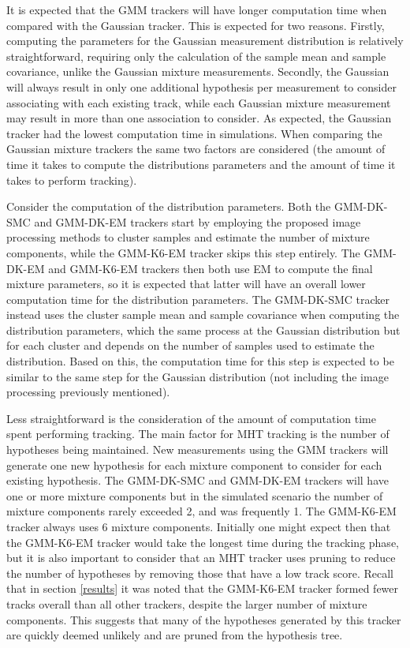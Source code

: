 \documentclass[journal]{IEEEtran}
\begin{document}
It is expected that the GMM trackers will have longer computation time when compared with the Gaussian tracker. This is expected for two reasons. Firstly, computing the parameters for the Gaussian measurement distribution is relatively straightforward, requiring only the calculation of the sample mean and sample covariance, unlike the Gaussian mixture measurements. Secondly, the Gaussian will always result in only one additional hypothesis per measurement to consider associating with each existing track, while each Gaussian mixture measurement may result in more than one association to consider. As expected, the Gaussian tracker had the lowest computation time in simulations. When comparing the Gaussian mixture trackers the same two factors are considered (the amount of time it takes to compute the distributions parameters and the amount of time it takes to perform tracking).

Consider the computation of the distribution parameters. Both the GMM-DK-SMC and GMM-DK-EM trackers start by employing the proposed image processing methods to cluster samples and estimate the number of mixture components, while the GMM-K6-EM tracker skips this step entirely. The GMM-DK-EM and GMM-K6-EM trackers then both use EM to compute the final mixture parameters, so it is expected that latter will have an overall lower computation time for the distribution parameters. The GMM-DK-SMC tracker instead uses the cluster sample mean and sample covariance when computing the distribution parameters, which the same process at the Gaussian distribution but for each cluster and depends on the number of samples used to estimate the distribution. Based on this, the computation time for this step is expected to be similar to the same step for the Gaussian distribution (not including the image processing previously mentioned).

Less straightforward is the consideration of the amount of computation time spent performing tracking. The main factor for MHT tracking is the number of hypotheses being maintained. New measurements using the GMM trackers will generate one new hypothesis for each mixture component to consider for each existing hypothesis. The GMM-DK-SMC and GMM-DK-EM trackers will have one or more mixture components but in the simulated scenario the number of mixture components rarely exceeded 2, and was frequently 1. The GMM-K6-EM tracker always uses 6 mixture components. Initially one might expect then that the GMM-K6-EM tracker would take the longest time during the tracking phase, but it is also important to consider that an MHT tracker uses pruning to reduce the number of hypotheses by removing those that have a low track score. Recall that in section \ref{results} it was noted that the GMM-K6-EM tracker formed fewer tracks overall than all other trackers, despite the larger number of mixture components. This suggests that many of the hypotheses generated by this tracker are quickly deemed unlikely and are pruned from the hypothesis tree.
\end{document}
